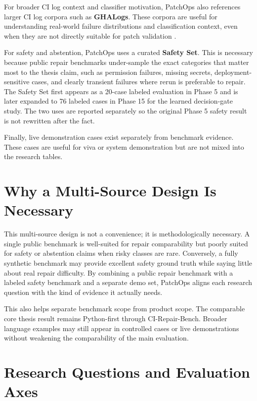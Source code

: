 For broader CI log context and classifier motivation, PatchOps also references larger CI log corpora such as
\textbf{GHALogs}. These corpora are useful for understanding real-world failure distributions and classification
context, even when they are not directly suitable for patch validation \cite{ghalogs2025}.

For safety and abstention, PatchOps uses a curated \textbf{Safety Set}. This is necessary because public repair
benchmarks under-sample the exact categories that matter most to the thesis claim, such as permission failures,
missing secrets, deployment-sensitive cases, and clearly transient failures where rerun is preferable to
repair. The Safety Set first appears as a 20-case labeled evaluation in Phase 5 and is later expanded to 76
labeled cases in Phase 15 for the learned decision-gate study. The two uses are reported separately so the
original Phase 5 safety result is not rewritten after the fact.

Finally, live demonstration cases exist separately from benchmark evidence. These cases are useful for viva or
system demonstration but are not mixed into the research tables.

\section{Why a Multi-Source Design Is Necessary}

This multi-source design is not a convenience; it is methodologically necessary. A single public benchmark is
well-suited for repair comparability but poorly suited for safety or abstention claims when risky classes are
rare. Conversely, a fully synthetic benchmark may provide excellent safety ground truth while saying little
about real repair difficulty. By combining a public repair benchmark with a labeled safety benchmark and a
separate demo set, PatchOps aligns each research question with the kind of evidence it actually needs.

This also helps separate benchmark scope from product scope. The comparable core thesis result remains
Python-first through CI-Repair-Bench. Broader language examples may still appear in controlled cases or live
demonstrations without weakening the comparability of the main evaluation.

\section{Research Questions and Evaluation Axes}

